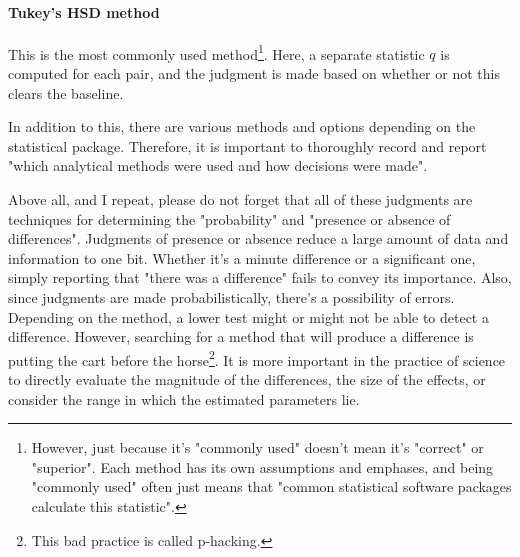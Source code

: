 \documentclass{ltjsarticle}
\begin{document}
\paragraph{Tukey's HSD method} This is the most commonly used method\footnote{However, just because it's "commonly used" doesn't mean it's "correct" or "superior". Each method has its own assumptions and emphases, and being "commonly used" often just means that "common statistical software packages calculate this statistic".}. Here, a separate statistic $q$ is computed for each pair, and the judgment is made based on whether or not this clears the baseline.

In addition to this, there are various methods and options depending on the statistical package. Therefore, it is important to thoroughly record and report "which analytical methods were used and how decisions were made".

Above all, and I repeat, please do not forget that all of these judgments are techniques for determining the "probability" and "presence or absence of differences". Judgments of presence or absence reduce a large amount of data and information to one bit. Whether it's a minute difference or a significant one, simply reporting that "there was a difference" fails to convey its importance. Also, since judgments are made probabilistically, there's a possibility of errors. Depending on the method, a lower test might or might not be able to detect a difference. However, searching for a method that will produce a difference is putting the cart before the horse\footnote{This bad practice is called p-hacking.}. It is more important in the practice of science to directly evaluate the magnitude of the differences, the size of the effects, or consider the range in which the estimated parameters lie.
\end{document}
